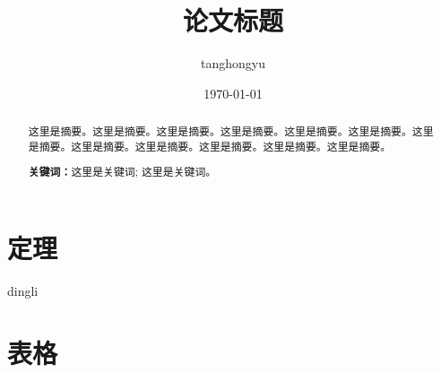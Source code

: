 \documentclass[12pt, a4paper, oneside]{ctexart}
\title{\textbf{论文标题}}
\author{tanghongyu}
\date{\today}
\newtheorem{theorem}{定理}[section]
\begin{document}
\maketitle

\setcounter{page}{0}
\maketitle
\thispagestyle{empty}
\newpage
\begin{abstract}
    这里是摘要。这里是摘要。这里是摘要。这里是摘要。这里是摘要。这里是摘要。这里是摘要。这里是摘要。这里是摘要。这里是摘要。这里是摘要。这里是摘要。
    \par\textbf{关键词：}这里是关键词; 这里是关键词。
\end{abstract}

\newpage
{}
\setcounter{page}{1}
\tableofcontents
\newpage
\setcounter{page}{1}

\section{定理}

dingli\cite{elgamal1985public}
\newpage




\section{表格}

\begin{table}[htbp]
    \centering  %
    \caption{ }  %
    \label{tab1}  %
    \begin{tabular}{|c|c|c|}
    \end{tabular}
\end{table}


\begin{table}[htbp]
    \centering  %
    \caption{ }  %
    \label{tab2}  %
    \begin{adjustbox}{max width=\textwidth}
        \begin{tabular}{|c|c|c|}
        \end{tabular}
    \end{adjustbox}
\end{table}
\end{document}
